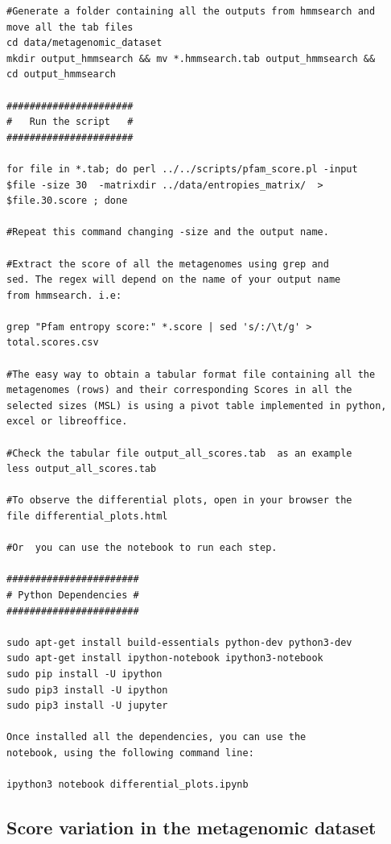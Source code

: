 \documentclass[a4paper,11pt]{report}
\begin{document}
\begin{verbatim}
#Generate a folder containing all the outputs from hmmsearch and 
move all the tab files  
cd data/metagenomic_dataset
mkdir output_hmmsearch && mv *.hmmsearch.tab output_hmmsearch && 
cd output_hmmsearch 

######################
#   Run the script   #
######################

for file in *.tab; do perl ../../scripts/pfam_score.pl -input 
$file -size 30  -matrixdir ../data/entropies_matrix/  > 
$file.30.score ; done 

#Repeat this command changing -size and the output name. 

#Extract the score of all the metagenomes using grep and 
sed. The regex will depend on the name of your output name 
from hmmsearch. i.e:

grep "Pfam entropy score:" *.score | sed 's/:/\t/g' > 
total.scores.csv 

#The easy way to obtain a tabular format file containing all the 
metagenomes (rows) and their corresponding Scores in all the 
selected sizes (MSL) is using a pivot table implemented in python, excel or libreoffice.

#Check the tabular file output_all_scores.tab  as an example 
less output_all_scores.tab

#To observe the differential plots, open in your browser the 
file differential_plots.html

#Or  you can use the notebook to run each step.

#######################
# Python Dependencies #
#######################

sudo apt-get install build-essentials python-dev python3-dev
sudo apt-get install ipython-notebook ipython3-notebook
sudo pip install -U ipython
sudo pip3 install -U ipython
sudo pip3 install -U jupyter

Once installed all the dependencies, you can use the 
notebook, using the following command line:

ipython3 notebook differential_plots.ipynb

\end{verbatim}
\subsection{Score variation in the metagenomic dataset }
\end{document}
